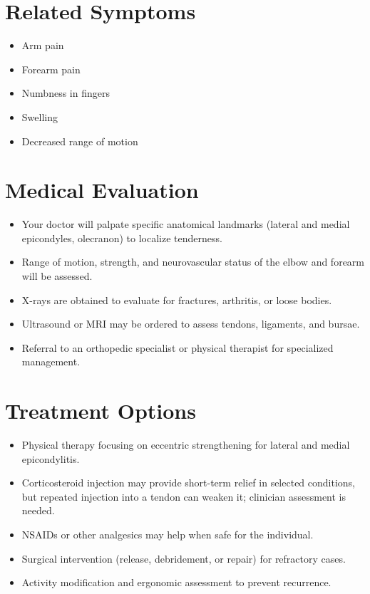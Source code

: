 \section*{Related Symptoms}
\begin{itemize}
  \item Arm pain
  \item Forearm pain
  \item Numbness in fingers
  \item Swelling
  \item Decreased range of motion
\end{itemize}


\section*{Medical Evaluation}
\begin{itemize}
  \item Your doctor will palpate specific anatomical landmarks (lateral and medial epicondyles, olecranon) to localize tenderness.
  \item Range of motion, strength, and neurovascular status of the elbow and forearm will be assessed.
  \item X-rays are obtained to evaluate for fractures, arthritis, or loose bodies.
  \item Ultrasound or MRI may be ordered to assess tendons, ligaments, and bursae.
  \item Referral to an orthopedic specialist or physical therapist for specialized management.
\end{itemize}

\section*{Treatment Options}
\begin{itemize}
  \item Physical therapy focusing on eccentric strengthening for lateral and medial epicondylitis.
  \item Corticosteroid injection may provide short-term relief in selected conditions, but repeated injection into a tendon can weaken it; clinician assessment is needed.
  \item NSAIDs or other analgesics may help when safe for the individual.
  \item Surgical intervention (release, debridement, or repair) for refractory cases.
  \item Activity modification and ergonomic assessment to prevent recurrence.
\end{itemize}


